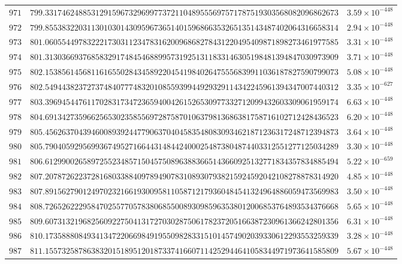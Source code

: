 \documentclass[12pt,reqno]{amsart}
\theoremstyle{remark}
\begin{document}
\begin{longtable}{clc}
$971$ & $799.3317462488531291596732969977372110489555697571787519303568082096862673$ & $3.59\times 10^{-448}$ \\
$972$ & $799.8553832203113010301430959673651401596866353265135143487402064316658314$ & $2.94\times 10^{-448}$ \\
$973$ & $801.0605544978322217303112347831620096868278431220495409871898273461977585$ & $3.31\times 10^{-448}$ \\
$974$ & $801.3130366937685832917484546889957319251311833146305198481394847030973909$ & $3.71\times 10^{-448}$ \\
$975$ & $802.1538561456811616550284345892204541984026475556839911036187827590799073$ & $5.08\times 10^{-448}$ \\
$976$ & $802.5494438237273748407774832010855939944929329114342245961394347007440312$ & $3.35\times 10^{-627}$ \\
$977$ & $803.3969454476117028317347236594004261526530977332712099432603309061959174$ & $6.63\times 10^{-448}$ \\
$978$ & $804.6913427359662565302358556972875870106379813686381758716102712428436523$ & $6.20\times 10^{-448}$ \\
$979$ & $805.4562637043946008939244779063704045835480830934621871236317248712394873$ & $3.64\times 10^{-448}$ \\
$980$ & $805.7904059295699367495271664431484424000254873804874403312551277125034289$ & $3.30\times 10^{-448}$ \\
$981$ & $806.6129900265897255234857150457508963883665143660925132771834357834885494$ & $5.22\times 10^{-659}$ \\
$982$ & $807.2078726223728168033884097894907831089307938215924592042108278878314920$ & $4.85\times 10^{-448}$ \\
$983$ & $807.8915627901249702321661930095811058712179360484541324964886059473569983$ & $3.50\times 10^{-448}$ \\
$984$ & $808.7265262229584702557705783806855008930985963538012006853764893534376668$ & $5.65\times 10^{-448}$ \\
$985$ & $809.6073132196825609227504131727030287506178237205166387230961366242801356$ & $6.31\times 10^{-448}$ \\
$986$ & $810.1735888084934134722066984919550982833151014574902039330612293553259339$ & $3.28\times 10^{-448}$ \\
$987$ & $811.1557325878638320151895120187337416607114252944641058344971973641585809$ & $5.67\times 10^{-448}$ \\

\end{longtable}
\end{document}
